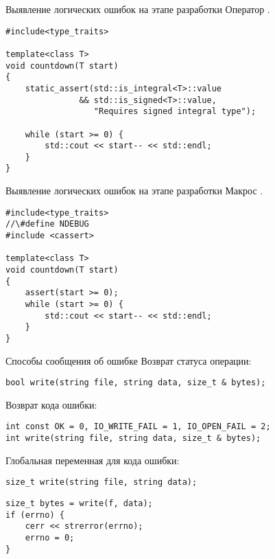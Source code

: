\documentclass{beamer}
\begin{document}
\begin{frame}[fragile]{Выявление логических ошибок на этапе разработки}
    Оператор .\\
    \mbox{}
    \begin{lstlisting}
#include<type_traits>

template<class T> 
void countdown(T start) 
{
    static_assert(std::is_integral<T>::value
               && std::is_signed<T>::value, 
                  "Requires signed integral type");
                  
    while (start >= 0) {
        std::cout << start-- << std::endl;
    }
}
    \end{lstlisting}
\end{frame}

\begin{frame}[fragile]{Выявление логических ошибок на этапе разработки}
    Макрос .
    \begin{lstlisting}
#include<type_traits>
//\#define NDEBUG
#include <cassert>

template<class T> 
void countdown(T start) 
{
    assert(start >= 0);
    while (start >= 0) {
        std::cout << start-- << std::endl;
    }
}
    \end{lstlisting}
\end{frame}

\begin{frame}[fragile]{Способы сообщения об ошибке}
\small
        \fakeitem Возврат статуса операции:
    \begin{lstlisting}
bool write(string file, string data, size_t & bytes);
    \end{lstlisting}

        \fakeitem Возврат кода ошибки:
    \begin{lstlisting}
int const OK = 0, IO_WRITE_FAIL = 1, IO_OPEN_FAIL = 2;
int write(string file, string data, size_t & bytes);
    \end{lstlisting}

        \fakeitem Глобальная переменная для кода ошибки:
    \begin{lstlisting}
size_t write(string file, string data);
    \end{lstlisting}

    \begin{lstlisting}
size_t bytes = write(f, data);
if (errno) {
    cerr << strerror(errno);
    errno = 0;
}
\end{lstlisting}
\end{frame}
\end{document}
